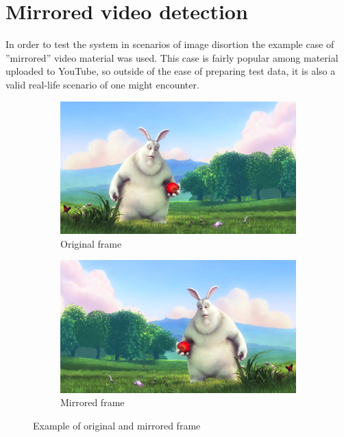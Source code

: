\section{Mirrored video detection}
\label{sec:mirrored-video-detection}
In order to test the system in scenarios of image disortion the example case of ''mirrored'' video material was used. This case is fairly popular among material uploaded to YouTube, so outside of the ease of preparing test data, it is also a valid real-life scenario of one might encounter.

\begin{figure}
        \centering
        \begin{subfigure}[b]{0.45\textwidth}
                \includegraphics[width=\textwidth]{img/Big_Buck_Bunny_normal.png}
                \caption{Original frame}
                \label{fig:original-frame}
        \end{subfigure}
        \begin{subfigure}[b]{0.45\textwidth}
                \includegraphics[width=\textwidth]{img/Big_Buck_Bunny_mirror.png}
                \caption{Mirrored frame}
                \label{fig:mirrored-frame}
        \end{subfigure}
        \caption{Example of original and mirrored frame}\label{fig:frames-mirrored}
\end{figure}


